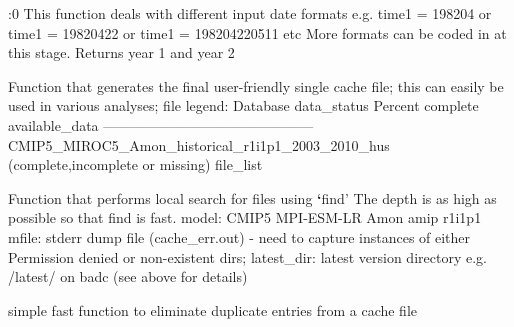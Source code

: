 \documentclass[letterpaper,10pt,english]{sphinxmanual}
\begin{document}

\begin{fulllineitems}
:0
\label{\detokenize{index:cmip5datafinder.date_handling}}
This function deals with different input date formats e.g.
time1 = 198204 or
time1 = 19820422 or
time1 = 198204220511 etc
More formats can be coded in at this stage.
Returns year 1 and year 2

\end{fulllineitems}


\begin{fulllineitems}
\label{\detokenize{index:cmip5datafinder.final_cache}}
Function that generates the final user-friendly
single cache file; this can easily be used
in various analyses; file legend:
Database \textbar{} data\_status \textbar{} Percent complete \textbar{} available\_data
---------------------------------------------
CMIP5\_MIROC5\_Amon\_historical\_r1i1p1\_2003\_2010\_hus (complete,incomplete or missing) file_list

\end{fulllineitems}


\begin{fulllineitems}
\label{\detokenize{index:cmip5datafinder.find_local_files}}
Function that performs local search for files using {\color{red}\bfseries{}{}`}find'
The depth is as high as possible so that find is fast.
model: CMIP5 MPI-ESM-LR Amon amip r1i1p1
mfile: stderr dump file (cache\_err.out) - need to capture
instances of either Permission denied or non-existent dirs;
latest\_dir: latest version directory e.g. /latest/ on badc
(see above for details)

\end{fulllineitems}


\begin{fulllineitems}
\label{\detokenize{index:cmip5datafinder.fix_duplicate_entries}}
simple fast function to eliminate duplicate entries
from a cache file

\end{fulllineitems}
\end{document}
